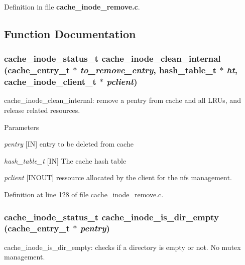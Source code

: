 Definition in file {\bf cache\_\-inode\_\-remove.c}.

\subsection{Function Documentation}
\subsubsection[{cache\_\-inode\_\-clean\_\-internal}]{\setlength{\rightskip}{0pt plus 5cm}cache\_\-inode\_\-status\_\-t cache\_\-inode\_\-clean\_\-internal (cache\_\-entry\_\-t $\ast$ {\em to\_\-remove\_\-entry}, \/  hash\_\-table\_\-t $\ast$ {\em ht}, \/  cache\_\-inode\_\-client\_\-t $\ast$ {\em pclient})}\label{cache__inode__remove_8c_ab37607d51033bda097ac6ff80f79a0ff}
cache\_\-inode\_\-clean\_\-internal: remove a pentry from cache and all LRUs, and release related resources.


\begin{DoxyParams}{Parameters}
\item[{\em pentry}][IN] entry to be deleted from cache \item[{\em hash\_\-table\_\-t}][IN] The cache hash table \item[{\em pclient}][INOUT] ressource allocated by the client for the nfs management. \end{DoxyParams}


Definition at line 128 of file cache\_\-inode\_\-remove.c.
\subsubsection[{cache\_\-inode\_\-is\_\-dir\_\-empty}]{\setlength{\rightskip}{0pt plus 5cm}cache\_\-inode\_\-status\_\-t cache\_\-inode\_\-is\_\-dir\_\-empty (cache\_\-entry\_\-t $\ast$ {\em pentry})}\label{cache__inode__remove_8c_a9eb8017e3c52113989ef8b3cb68b9d0e}
cache\_\-inode\_\-is\_\-dir\_\-empty: checks if a directory is empty or not. No mutex management.

